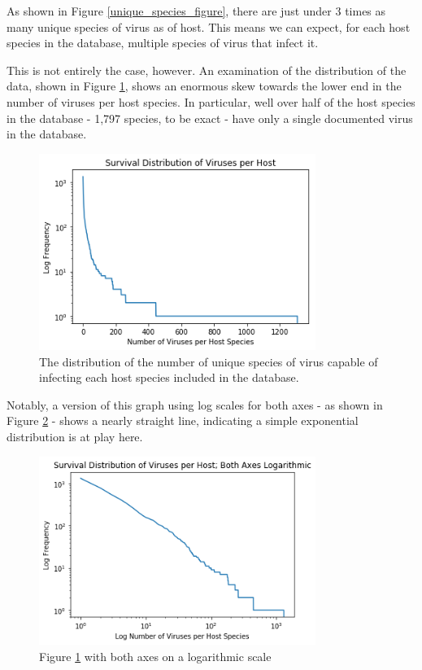 \documentclass[12pt]{article}
\begin{document}
    As shown in Figure \ref{unique_species_figure}, there are just under 3
    times as many unique species of virus as of host. This means we can expect,
    for each host species in the database, multiple species of virus that infect
    it.

    This is not entirely the case, however. An examination of the distribution of
    the data, shown in Figure \ref{viruses_per_host_figure}, shows an enormous skew
    towards the lower end in the number of viruses per host species. In particular,
    well over half of the host species in the database - 1,797 species, to be exact -
    have only a single documented virus in the database.
    
    \begin{figure}[H]
        \begin{center}
            \includegraphics[width=90mm]{viruses_per_host_figure.png}
            \caption{The distribution of the number of unique species of virus
            capable of infecting each host species included in the database.}
            \label {viruses_per_host_figure}
        \end{center}
    \end{figure}

    Notably, a version of this graph using log scales for both axes - as shown in
    Figure \ref{log_viruses_per_host_figure} - shows a nearly straight line,
    indicating a simple exponential distribution is at play here.

    \begin{figure}[H]
        \begin{center}
            \includegraphics[width=90mm]{log_viruses_per_host_figure.png}
            \caption{Figure \ref{viruses_per_host_figure} with both axes on a
            logarithmic scale}
            \label{log_viruses_per_host_figure}
        \end{center}
    \end{figure}
\end{document}
